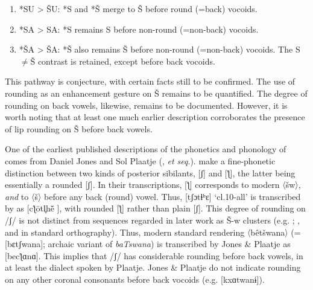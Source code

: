 \begin{enumerate}
\begin{enumerate}
\item *SU > ŠU: *S and *Š merge to Š before round (=back) vocoids.
\item *SA > SA: *S remains S before non-round (=non-back) vocoids.
\item *ŠA > ŠA: *Š also remains Š before non-round (=non-back) vocoids. The S${\neq}$Š contrast is retained, except before back vocoids.
\end{enumerate}

\end{enumerate}

This pathway is conjecture, with certain facts still to be confirmed. The use of rounding as an enhancement gesture on Š remains to be quantified. The degree of rounding on back vowels, likewise, remains to be documented. However, it is worth noting that at least one much earlier description corroborates the presence of lip rounding on Š before back vowels.

One of the earliest published descriptions of the phonetics and phonology of  comes from Daniel Jones and Sol Plaatje (\citealt{Jones&Plaatje1916}, \textit{et seq}.). \citet[xx.32]{Jones&Plaatje1916} make a fine-phonetic distinction between two kinds of posterior sibilants, [ʃ] and [ƪ], the latter being essentially a rounded [ʃ]. In their transcriptions, [ƪ] corresponds to modern 〈šw〉, \textit{and} to 〈š〉 before any back (round) vowel.  Thus, [tʃɔtɬʰɛ] ‘cl.10-all’ is transcribed by \citet[3]{Jones&Plaatje1916} as [cƪ\={o}tl̥h\={e}\v{} ], with rounded [ƪ] rather than plain [ʃ]. This degree of rounding on /ʃ/ is not distinct from sequences regarded in later work as Š-w clusters (e.g. \citealt{Cole1955}; \citealt{chebanneetal1997}, and in standard orthography). Thus, modern standard rendering 〈bêtšwana〉 (= [bɛtʃwana]; archaic variant of \textit{baTswana}) is transcribed by Jones \& Plaatje as [becƪɑnɑ]. This implies that /ʃ/ has considerable rounding before back vowels, in at least the  dialect spoken by Plaatje. Jones \& Plaatje do not indicate rounding on any other coronal consonants before back vocoids (e.g. [kxɑtwanɨ]).

